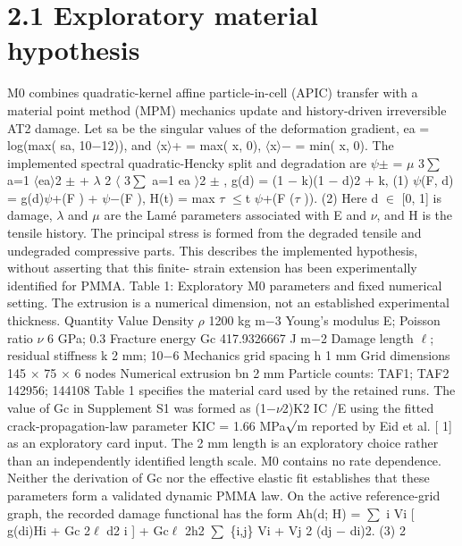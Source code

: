 \documentclass[11pt]{article}
\begin{document}
\section*{2.1 Exploratory material hypothesis}

M0 combines quadratic-kernel affine particle-in-cell (APIC) transfer with a material point method
(MPM) mechanics update and history-driven irreversible AT2 damage. Let sa be the singular values
of the deformation gradient, ea = log(max( sa, 10\ensuremath{-}12)), and \ensuremath{\langle}x\ensuremath{\rangle}+ = max( x, 0), \ensuremath{\langle}x\ensuremath{\rangle}\ensuremath{-} = min( x, 0).
The implemented spectral quadratic-Hencky split and degradation are
\ensuremath{\psi}\ensuremath{\pm} = \ensuremath{\mu}
3\ensuremath{\sum}
a=1
\ensuremath{\langle}ea\ensuremath{\rangle}2
\ensuremath{\pm} + \ensuremath{\lambda}
2
\ensuremath{\langle} 3\ensuremath{\sum}
a=1
ea
\ensuremath{\rangle}2
\ensuremath{\pm}
, g(d) = (1 \ensuremath{-} k)(1 \ensuremath{-} d)2 + k, (1)
\ensuremath{\psi}(F, d) = g(d)\ensuremath{\psi}+(F ) + \ensuremath{\psi}\ensuremath{-}(F ), H(t) = max
\ensuremath{\tau} \ensuremath{\leq}t
\ensuremath{\psi}+(F (\ensuremath{\tau} )). (2)
Here d \ensuremath{\in} [0, 1] is damage, \ensuremath{\lambda} and \ensuremath{\mu} are the Lamé parameters associated with E and \ensuremath{\nu}, and H
is the tensile history. The principal stress is formed from the degraded tensile and undegraded
compressive parts. This describes the implemented hypothesis, without asserting that this finite-
strain extension has been experimentally identified for PMMA.
Table 1: Exploratory M0 parameters and fixed numerical setting. The extrusion is a numerical
dimension, not an established experimental thickness.
Quantity Value
Density \ensuremath{\rho} 1200 kg m\ensuremath{-}3
Young’s modulus E; Poisson ratio \ensuremath{\nu} 6 GPa; 0.3
Fracture energy Gc 417.9326667 J m\ensuremath{-}2
Damage length \ensuremath{\ell}; residual stiffness k 2 mm; 10\ensuremath{-}6
Mechanics grid spacing h 1 mm
Grid dimensions 145 \ensuremath{\times} 75 \ensuremath{\times} 6 nodes
Numerical extrusion bn 2 mm
Particle counts: TAF1; TAF2 142956; 144108
Table 1 specifies the material card used by the retained runs. The value of Gc in Supplement S1
was formed as (1\ensuremath{-}\ensuremath{\nu}2)K2
IC /E using the fitted crack-propagation-law parameter KIC = 1.66 MPa\ensuremath{\surd}m
reported by Eid et al. [ 1] as an exploratory card input. The 2 mm length is an exploratory choice
rather than an independently identified length scale. M0 contains no rate dependence. Neither
the derivation of Gc nor the effective elastic fit establishes that these parameters form a validated
dynamic PMMA law.
On the active reference-grid graph, the recorded damage functional has the form
Ah(d; H) =
\ensuremath{\sum}
i
Vi
[
g(di)Hi + Gc
2\ensuremath{\ell} d2
i
]
+ Gc\ensuremath{\ell}
2h2
\ensuremath{\sum}
\{i,j\}
Vi + Vj
2 (dj \ensuremath{-} di)2. (3)
2
\end{document}
